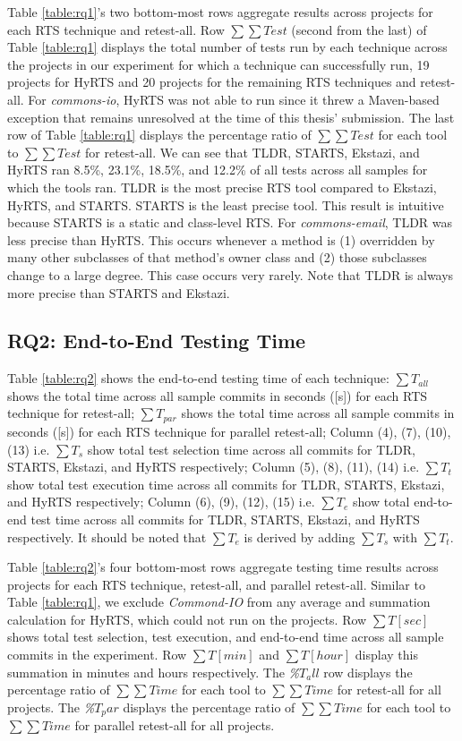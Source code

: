 Table \ref{table:rq1}'s two bottom-most rows aggregate results across projects for each RTS technique and retest-all. Row $\sum\sum Test$ (second from the last) of Table \ref{table:rq1} displays the total number of tests run by each technique across the projects in our experiment for which a technique can successfully run, 19 projects for HyRTS and 20 projects for the remaining RTS techniques and retest-all. For \textit{commons-io}, HyRTS was not able to run since it threw a Maven-based exception that remains unresolved at the time of this thesis' submission. The last row of Table \ref{table:rq1} displays the percentage ratio of $\sum\sum Test$ for each tool to $\sum \sum Test$ for retest-all. We can see that TLDR, STARTS, Ekstazi, and HyRTS ran 8.5\%, 23.1\%, 18.5\%, and 12.2\% of all tests across all samples for which the tools ran.  TLDR is the most precise RTS tool compared to Ekstazi, HyRTS, and STARTS. STARTS is the least precise tool. This result is intuitive because STARTS is a static and class-level RTS. For \textit{commons-email}, TLDR was less precise than HyRTS. This occurs whenever a method is (1) overridden by many other subclasses of that method's owner class and (2) those subclasses change to a large degree. This case occurs very rarely. Note that TLDR is always more precise than STARTS and Ekstazi.

\subsection{RQ2: End-to-End Testing Time } 

Table \ref{table:rq2} shows the end-to-end testing time of each technique: $\sum {T}_{all}$ shows the total time across all sample commits in seconds ([s]) for each RTS technique for retest-all; $\sum {T}_{par}$ shows the total time across all sample commits in seconds ([s]) for each RTS technique for parallel retest-all; Column (4), (7), (10), (13) i.e. $\sum {T}_{s}$ show total test selection time across all commits for TLDR, STARTS, Ekstazi, and HyRTS respectively; Column (5), (8), (11), (14) i.e. $\sum {T}_{t}$ show total test execution time across all commits for TLDR, STARTS, Ekstazi, and HyRTS respectively; Column (6), (9), (12), (15) i.e. $\sum {T}_{e}$ show total end-to-end test time across all commits for TLDR, STARTS, Ekstazi, and HyRTS respectively. It should be noted that $\sum {T}_{e}$ is derived by adding $\sum {T}_{s}$ with $\sum {T}_{t}$.

Table \ref{table:rq2}'s four bottom-most rows aggregate testing time results across projects for each RTS technique, retest-all, and parallel retest-all. Similar to Table \ref{table:rq1}, we exclude \textit{Commond-IO} from any average and summation calculation for HyRTS, which could not run on the projects. Row $\sum T[sec]$ shows total test selection, test execution, and end-to-end time across all sample commits in the experiment. Row $\sum T[min]$ and $\sum T[hour]$ display this summation in minutes and hours respectively. The \textit{\%$T_all$} row displays the percentage ratio of $\sum\sum Time$ for each tool to $\sum \sum Time$ for retest-all for all projects. The \textit{\%$T_par$} displays the percentage ratio of $\sum\sum Time$ for each tool to $\sum \sum Time$ for parallel retest-all for all projects. 

